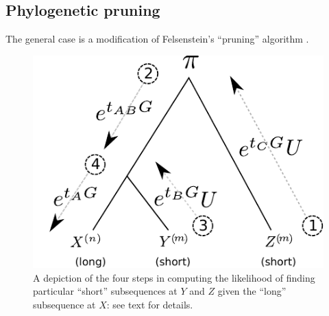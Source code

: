 \documentclass{article}
\theoremstyle{plain}
\theoremstyle{definition}
\begin{document}
\subsection{Phylogenetic pruning}

The general case is a modification of Felsenstein's ``pruning'' algorithm \citep{felsenstein1981evolutionary}.

\begin{figure}
    \begin{center}
    \includegraphics{pruning-schematic}
    \end{center}
    \caption{
        A depiction of the four steps in computing the likelihood
        of finding particular ``short'' subsequences at $Y$ and $Z$
        given the ``long'' subsequence at $X$: see text for details.
        \label{fig:pruning}
    }
\end{figure}
\end{document}
